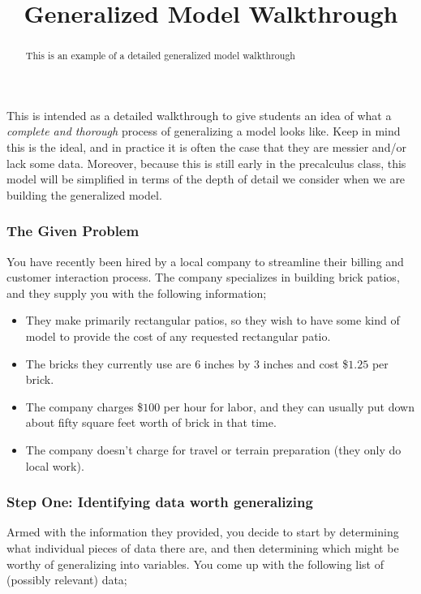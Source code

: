 \documentclass{ximeraXloud}
\title{Generalized Model Walkthrough}
\begin{document}
\begin{abstract}
    This is an example of a detailed generalized model walkthrough
\end{abstract}
\maketitle

\begin{example}

    This is intended as a detailed walkthrough to give students an idea of what a \textit{complete and thorough} process of generalizing a model looks like. Keep in mind this is the ideal, and in practice it is often the case that they are messier and/or lack some data. Moreover, because this is still early in the precalculus class, this model will be simplified in terms of the depth of detail we consider when we are building the generalized model.
    
    \subsubsection*{The Given Problem}
        You have recently been hired by a local company to streamline their billing and customer interaction process. The company specializes in building brick patios, and they supply you with the following information;
        
        \begin{itemize}
            \item They make primarily rectangular patios, so they wish to have some kind of model to provide the cost of any requested rectangular patio.
            \item The bricks they currently use are 6 inches by 3 inches and cost \$$1.25$ per brick.
            \item The company charges \$$100$ per hour for labor, and they can usually put down about fifty square feet worth of brick in that time.
            \item The company doesn't charge for travel or terrain preparation (they only do local work).
        \end{itemize}
    
    \subsubsection*{Step One: Identifying data worth generalizing}
    
        Armed with the information they provided, you decide to start by determining what individual pieces of data there are, and then determining which might be worthy of generalizing into variables. You come up with the following list of (possibly relevant) data;
        

\end{example}
\end{document}
